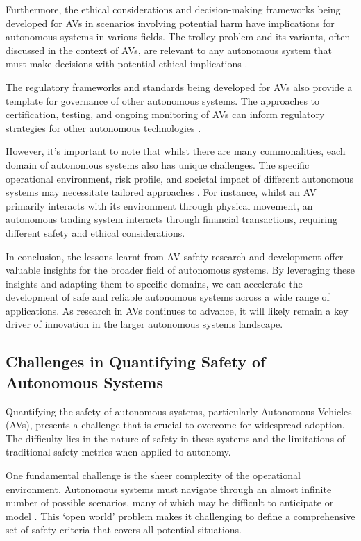 Furthermore, the ethical considerations and decision-making frameworks being developed for AVs in scenarios involving potential harm have implications for autonomous systems in various fields. The trolley problem and its variants, often discussed in the context of AVs, are relevant to any autonomous system that must make decisions with potential ethical implications \cite{Awad2018}.

The regulatory frameworks and standards being developed for AVs also provide a template for governance of other autonomous systems. The approaches to certification, testing, and ongoing monitoring of AVs can inform regulatory strategies for other autonomous technologies \cite{Cummings2021}.

However, it's important to note that whilst there are many commonalities, each domain of autonomous systems also has unique challenges. The specific operational environment, risk profile, and societal impact of different autonomous systems may necessitate tailored approaches \cite{Endsley2017}. For instance, whilst an AV primarily interacts with its environment through physical movement, an autonomous trading system interacts through financial transactions, requiring different safety and ethical considerations.

In conclusion, the lessons learnt from AV safety research and development offer valuable insights for the broader field of autonomous systems. By leveraging these insights and adapting them to specific domains, we can accelerate the development of safe and reliable autonomous systems across a wide range of applications. As research in AVs continues to advance, it will likely remain a key driver of innovation in the larger autonomous systems landscape.

\subsection{Challenges in Quantifying Safety of Autonomous Systems}

Quantifying the safety of autonomous systems, particularly Autonomous Vehicles (AVs), presents a challenge that is crucial to overcome for widespread adoption. The difficulty lies in the nature of safety in these systems and the limitations of traditional safety metrics when applied to autonomy.

One fundamental challenge is the sheer complexity of the operational environment. Autonomous systems must navigate through an almost infinite number of possible scenarios, many of which may be difficult to anticipate or model \cite{Koopman2016}. This `open world' problem makes it challenging to define a comprehensive set of safety criteria that covers all potential situations.

